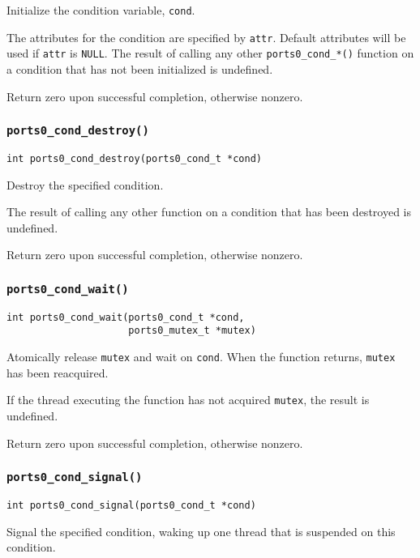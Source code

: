 Initialize the condition variable, {\tt cond}. 

The attributes for the condition are specified by {\tt attr}.  Default
attributes will be used if {\tt attr} is {\tt NULL}.  The result of
calling any other {\tt ports0\_cond\_*()} function on a condition that
has not been initialized is undefined.

Return zero upon successful completion, otherwise nonzero.


\subsubsection{\tt ports0\_cond\_destroy()}
\begin{verbatim}
int ports0_cond_destroy(ports0_cond_t *cond)
\end{verbatim}

Destroy the specified condition. 

The result of calling any other
function on a condition that has been destroyed is undefined.

Return zero upon successful completion, otherwise nonzero.


\subsubsection{\tt ports0\_cond\_wait()}
\begin{verbatim}
int ports0_cond_wait(ports0_cond_t *cond,
                     ports0_mutex_t *mutex)
\end{verbatim}

Atomically release {\tt mutex} and wait on {\tt cond}.  When the
function returns, {\tt mutex} has been reacquired.

If the thread executing the function has not acquired {\tt mutex},
the result is undefined.

Return zero upon successful completion, otherwise nonzero.


\subsubsection{\tt ports0\_cond\_signal()}
\begin{verbatim}
int ports0_cond_signal(ports0_cond_t *cond)
\end{verbatim}

Signal the specified condition, waking up one thread that is suspended
on this condition. 

